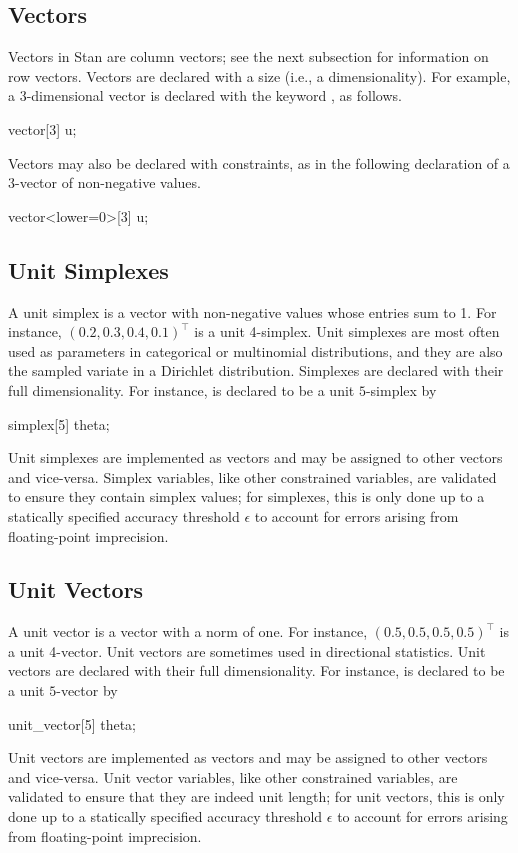 \subsection{Vectors}

Vectors in Stan are column vectors; see the next subsection for
information on row vectors.  Vectors are declared with a size (i.e., a
dimensionality).  For example, a 3-dimensional vector is declared with
the keyword , as follows.
%
\begin{stancode}
vector[3] u;
\end{stancode}
%
Vectors may also be declared with constraints, as in the following
declaration of a 3-vector of non-negative values.
%
\begin{stancode}
vector<lower=0>[3] u;
\end{stancode}
%

\subsection{Unit Simplexes}

A unit simplex is a vector with non-negative values whose entries sum
to 1.  For instance, $(0.2,0.3,0.4,0.1)^{\top}$ is a unit 4-simplex.
Unit simplexes are most often used as parameters in categorical
or multinomial distributions, and they are also the sampled variate in
a Dirichlet distribution.  Simplexes are declared with their full
dimensionality.  For instance,  is declared to
be a unit $5$-simplex by
%
\begin{stancode}
simplex[5] theta;
\end{stancode}
%

Unit simplexes are implemented as vectors and may be assigned to other
vectors and vice-versa.  Simplex variables, like other constrained
variables, are validated to ensure they contain simplex values; for
simplexes, this is only done up to a statically specified accuracy
threshold $\epsilon$ to account for errors arising from floating-point
imprecision.

\subsection{Unit Vectors}

A unit vector is a vector with a norm of one.  For instance,
$(0.5,0.5,0.5,0.5)^{\top}$ is a unit 4-vector.
Unit vectors are sometimes used in directional statistics.
Unit vectors are declared with their full
dimensionality.  For instance,  is declared to
be a unit $5$-vector by
%
\begin{stancode}
unit_vector[5] theta;
\end{stancode}
%
Unit vectors are implemented as vectors and may be assigned to other
vectors and vice-versa.  Unit vector variables, like other constrained
variables, are validated to ensure that they are indeed unit length; for
unit vectors, this is only done up to a statically specified accuracy
threshold $\epsilon$ to account for errors arising from floating-point
imprecision.

